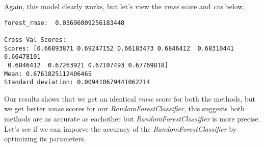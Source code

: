 \documentclass[8pt]{article}
\begin{document}
\newline
\newline
Again, this model clearly works, but let's view the \textit{rmse} score and \textit{cvs} below,
\newline
\newline
\begin{adjustbox}{max width=\textwidth}
\begin{lstlisting}
forest_rmse:  0.03696009256183448

Cross Val Scores:
Scores: [0.66893871 0.69247152 0.66183473 0.6846412  0.68310441 0.66478101
 0.6846412  0.67263921 0.67107493 0.67769818]
Mean: 0.6761825112406465
Standard deviation: 0.009410679441062214
\end{lstlisting}
\end{adjustbox}
\newline
\newline
Our results shows that we get an identical \textit{rmse} score for both the methods, but we get better \textit{nmse} scores for our \textit{RandomForestClassifier}, this suggests both methods are as accurate as eachother but \textit{RandomForestClassifier} is more precise. Let's see if we can imporve the accuracy of the \textit{RandomForestClassifier} by optimizing its parameters.
\end{document}
